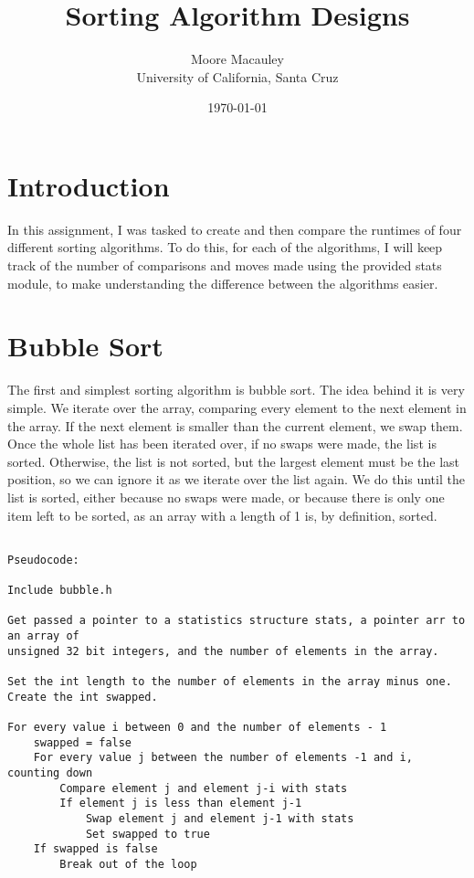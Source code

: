 \documentclass[11pt]{article}
\title{Sorting Algorithm Designs}
\author{Moore Macauley \\ University of California, Santa Cruz}
\date{\today}
\begin{document}
\maketitle

\section{Introduction}

In this assignment, I was tasked to create and then compare the runtimes of four different sorting algorithms. To do this, for each of the algorithms, I will keep track of the number of comparisons and moves made using the provided stats module, to make understanding the difference between the algorithms easier.

\section{Bubble Sort}

The first and simplest sorting algorithm is bubble sort. The idea behind it is very simple. We iterate over the array, comparing every element to the next element in the array. If the next element is smaller than the current element, we swap them. Once the whole list has been iterated over, if no swaps were made, the list is sorted. Otherwise, the list is not sorted, but the largest element must be the last position, so we can ignore it as we iterate over the list again. We do this until the list is sorted, either because no swaps were made, or because there is only one item left to be sorted, as an array with a length of 1 is, by definition, sorted.

\begin{verbatim}

Pseudocode:

Include bubble.h

Get passed a pointer to a statistics structure stats, a pointer arr to an array of
unsigned 32 bit integers, and the number of elements in the array.

Set the int length to the number of elements in the array minus one.
Create the int swapped.

For every value i between 0 and the number of elements - 1
    swapped = false
    For every value j between the number of elements -1 and i, counting down
        Compare element j and element j-i with stats
        If element j is less than element j-1
            Swap element j and element j-1 with stats
            Set swapped to true
    If swapped is false
        Break out of the loop

\end{verbatim}
\end{document}
